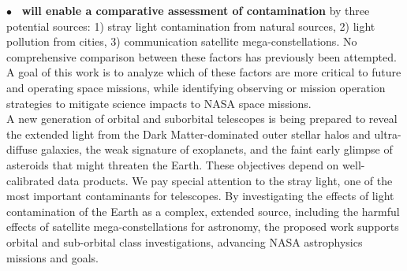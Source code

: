 \documentclass[usenames,dvipsnames,modern]{CLASS_FILES/aastex631}  %
\begin{document}
$\bullet$  \textbf{\MyName\ will enable a comparative assessment of contamination} by  three potential sources: 1) stray light contamination from natural sources, 2) light pollution from cities, 3) communication satellite mega-constellations. No comprehensive comparison between these factors has previously been attempted. A goal of this work is to analyze which of these factors are more critical to future and operating space missions, while identifying observing or mission operation strategies to mitigate science impacts to NASA space missions.\\

A new generation of orbital and suborbital telescopes is being prepared to reveal  the extended light from the Dark Matter-dominated outer stellar halos and ultra-diffuse galaxies, the weak signature of exoplanets, and the faint early glimpse of asteroids that might threaten the Earth. These objectives depend on well-calibrated data products. We pay special attention to the stray light, one of the most important contaminants for telescopes. By investigating the effects of light contamination of the Earth as a complex, extended source, including the harmful effects of satellite mega-constellations for astronomy, the proposed work supports orbital and sub-orbital class investigations, advancing NASA astrophysics missions and goals.  




\newpage
%

%

% 
\end{document}
